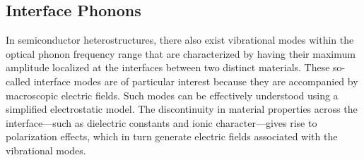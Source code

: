 \subsection{Interface Phonons}
In semiconductor heterostructures, there also exist vibrational modes within the optical phonon frequency range that are characterized by having their maximum amplitude localized at the interfaces between two distinct materials. These so-called interface modes are of particular interest because they are accompanied by macroscopic electric fields.
Such modes can be effectively understood using a simplified electrostatic model. The discontinuity in material properties across the interface—such as dielectric constants and ionic character—gives rise to polarization effects, which in turn generate electric fields associated with the vibrational modes.\\

